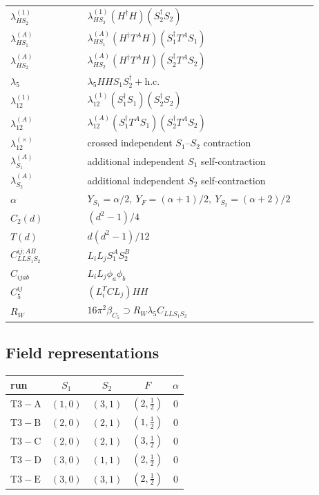 \documentclass[9pt]{article}
\begin{document}
\begin{longtable}{@{}p{0.23\linewidth}p{0.69\linewidth}@{}}
$\lambda_{HS_2}^{(1)}$ & $\lambda_{HS_2}^{(1)}(H^\dagger H)(S_2^\dagger S_2)$ \\
$\lambda_{HS_1}^{(A)}$ & $\lambda_{HS_1}^{(A)}(H^\dagger T^AH)(S_1^\dagger T^AS_1)$ \\
$\lambda_{HS_2}^{(A)}$ & $\lambda_{HS_2}^{(A)}(H^\dagger T^AH)(S_2^\dagger T^AS_2)$ \\
$\lambda_5$ & $\lambda_5HHS_1S_2^\dagger+\mathrm{h.c.}$ \\
$\lambda_{12}^{(1)}$ & $\lambda_{12}^{(1)}(S_1^\dagger S_1)(S_2^\dagger S_2)$ \\
$\lambda_{12}^{(A)}$ & $\lambda_{12}^{(A)}(S_1^\dagger T^AS_1)(S_2^\dagger T^AS_2)$ \\
$\lambda_{12}^{(\times)}$ & crossed independent $S_1$--$S_2$ contraction \\
$\lambda_{S_1}^{(A)}$ & additional independent $S_1$ self-contraction \\
$\lambda_{S_2}^{(A)}$ & additional independent $S_2$ self-contraction \\
$\alpha$ & $Y_{S_1}=\alpha/2,\ Y_F=(\alpha+1)/2,\ Y_{S_2}=(\alpha+2)/2$ \\
$C_2(d)$ & $(d^2-1)/4$ \\
$T(d)$ & $d(d^2-1)/12$ \\
$C_{LLS_1S_2}^{ij;AB}$ & $L_iL_jS_1^AS_2^B$ \\
$C_{ijab}$ & $L_iL_j\phi_a\phi_b$ \\
$C_5^{ij}$ & $(L_i^TCL_j)HH$ \\
$R_W$ & $16\pi^2\beta_{C_5}\supset R_W\lambda_5C_{LLS_1S_2}$ \\
\bottomrule
\end{longtable}
\subsection*{Field representations}
\begin{longtable}{@{}lcccc@{}}
\toprule
run & $S_1$ & $S_2$ & $F$ & $\alpha$ \\
\midrule
$\mathrm{T3-A}$ & $(1,0)$ & $(3,1)$ & $(2,\frac{1}{2})$ & $0$ \\
$\mathrm{T3-B}$ & $(2,0)$ & $(2,1)$ & $(1,\frac{1}{2})$ & $0$ \\
$\mathrm{T3-C}$ & $(2,0)$ & $(2,1)$ & $(3,\frac{1}{2})$ & $0$ \\
$\mathrm{T3-D}$ & $(3,0)$ & $(1,1)$ & $(2,\frac{1}{2})$ & $0$ \\
$\mathrm{T3-E}$ & $(3,0)$ & $(3,1)$ & $(2,\frac{1}{2})$ & $0$ \\
\bottomrule
\end{longtable}
\end{document}
